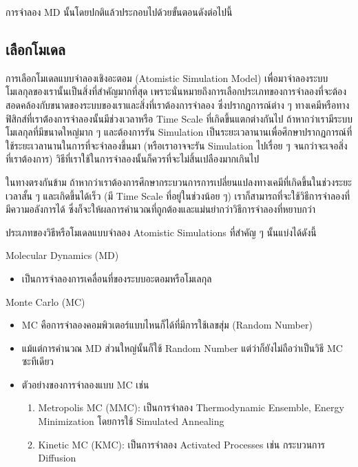 การจำลอง MD นั้นโดยปกติแล้วประกอบไปด้วยขั้นตอนดังต่อไปนี้

\subsection{เลือกโมเดล}

การเลือกโมเดลแบบจำลองเชิงอะตอม (Atomistic Simulation Model) เพื่อมาจำลองระบบโมเลกุลของเรานั้นเป็นสิ่งที่สำคัญมากที่สุด
เพราะนั่นหมายถึงการเลือกประเภทของการจำลองที่จะต้องสอดคล้องกับขนาดของระบบของเราและสิ่งที่เราต้องการจำลอง ซึ่งปรากฏการณ์ต่าง ๆ
ทางเคมีหรือทางฟิสิกส์ที่เราต้่องการจำลองนั้นมีช่วงเวลาหรือ Time Scale ที่เกิดขึ้นแตกต่างกันไป ถ้าหากว่าเรามีระบบโมเลกุลที่มีขนาดใหญ่มาก ๆ
และต้องการรัน Simulation เป็นระยะเวลานานเพื่อศึกษาปรากฏการณ์ที่ใช้ระยะเวลานานในการที่จะจำลองขึ้นมา (หรือเราอาจจะรัน Simulation
ไปเรื่อย ๆ จนกว่าจะเจอสิ่งที่เราต้องการ) วิธีที่เราใช้ในการจำลองนั้นก็ควรที่จะไม่สิ้นเปลืองมากเกินไป

ในทางตรงกันข้าม ถ้าหากว่าเราต้องการศึกษากระบวนการการเปลี่ยนแปลงทางเคมีที่เกิดขึ้นในช่วงระยะเวลาสั้น ๆ และเกิดขึ้นได้เร็ว (มี Time Scale
ที่อยู่ในช่วงน้อย ๆ) เราก็สามารถที่จะใช้วิธีการจำลองที่มีความอลังการได้ ซึ่งก็จะให้ผลการคำนวณที่ถูกต้องและแม่นยำกว่าวิธีการจำลองที่หยาบกว่า

ประเภทของวิธีหรือโมเดลแบบจำลอง Atomistic Simulations ที่สำคัญ ๆ นั้นแบ่งได้ดังนี้

Molecular Dynamics (MD)
\begin{itemize}[topsep=0pt,noitemsep]
  \setlength\itemsep{0.5em}
  \item เป็นการจำลองการเคลื่อนที่ของระบบอะตอมหรือโมเลกุล
\end{itemize}

Monte Carlo (MC)
\begin{itemize}[topsep=0pt,noitemsep]
  \setlength\itemsep{0.5em}
  \item MC คือการจำลองคอมพิวเตอร์แบบไหนก็ได้ที่มีการใช้เลขสุ่ม (Random Number)

  \item แม้แต่การคำนวณ MD ส่วนใหญ่นั้นก็ใช้ Random Number แต่ว่าก็ยังไม่ถือว่าเป็นวิธี MC ซะทีเดียว

  \item ตัวอย่างของการจำลองแบบ MC เช่น
        \begin{enumerate}[topsep=0pt,noitemsep]
          \setlength\itemsep{0.5em}

          \item Metropolis MC (MMC): เป็นการจำลอง Thermodynamic Ensemble, Energy Minimization โดยการใช้ Simulated
                Annealing

          \item Kinetic MC (KMC): เป็นการจำลอง Activated Processes เช่น กระบวนการ Diffusion
        \end{enumerate}
\end{itemize}

